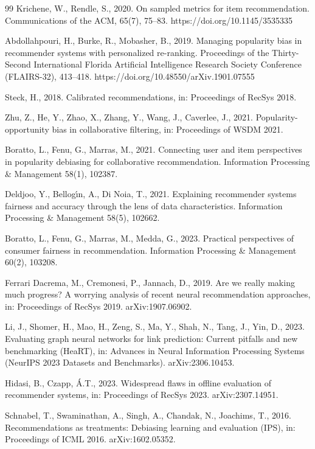 \documentclass[preprint,12pt]{elsarticle}
\begin{document}
\begin{thebibliography}{99}
Krichene, W., Rendle, S., 2020. On sampled metrics for item recommendation. Communications of the ACM, 65(7), 75–83. https://doi.org/10.1145/3535335

Abdollahpouri, H., Burke, R., Mobasher, B., 2019. Managing popularity bias in recommender systems with personalized re-ranking. Proceedings of the Thirty-Second International Florida Artificial Intelligence Research Society Conference (FLAIRS-32), 413–418. https://doi.org/10.48550/arXiv.1901.07555

Steck, H., 2018. Calibrated recommendations, in: Proceedings of RecSys 2018.

Zhu, Z., He, Y., Zhao, X., Zhang, Y., Wang, J., Caverlee, J., 2021. Popularity-opportunity bias in collaborative filtering, in: Proceedings of WSDM 2021.

Boratto, L., Fenu, G., Marras, M., 2021. Connecting user and item perspectives in popularity debiasing for collaborative recommendation. Information Processing \& Management 58(1), 102387.

Deldjoo, Y., Bellog\'{\i}n, A., Di Noia, T., 2021. Explaining recommender systems fairness and accuracy through the lens of data characteristics. Information Processing \& Management 58(5), 102662.

Boratto, L., Fenu, G., Marras, M., Medda, G., 2023. Practical perspectives of consumer fairness in recommendation. Information Processing \& Management 60(2), 103208.

Ferrari Dacrema, M., Cremonesi, P., Jannach, D., 2019. Are we really making much progress? A worrying analysis of recent neural recommendation approaches, in: Proceedings of RecSys 2019. arXiv:1907.06902.

Li, J., Shomer, H., Mao, H., Zeng, S., Ma, Y., Shah, N., Tang, J., Yin, D., 2023. Evaluating graph neural networks for link prediction: Current pitfalls and new benchmarking (HeaRT), in: Advances in Neural Information Processing Systems (NeurIPS 2023 Datasets and Benchmarks). arXiv:2306.10453.

Hidasi, B., Czapp, \'{A}.T., 2023. Widespread flaws in offline evaluation of recommender systems, in: Proceedings of RecSys 2023. arXiv:2307.14951.

Schnabel, T., Swaminathan, A., Singh, A., Chandak, N., Joachims, T., 2016. Recommendations as treatments: Debiasing learning and evaluation (IPS), in: Proceedings of ICML 2016. arXiv:1602.05352.


\end{thebibliography}
\end{document}
